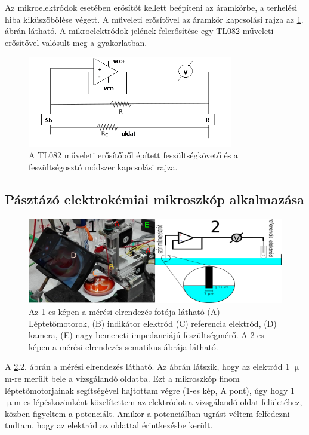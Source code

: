 Az mikroelektródok esetében erősítőt kellett beépíteni az áramkörbe, a terhelési hiba kiküszöbölése végett. A műveleti erősítővel az áramkör kapcsolási rajza az \ref{fig:erosito}. ábrán látható. A mikroelektródok jelének felerősítése egy TL082-műveleti erősítővel valósult meg a gyakorlatban.
\begin{figure}[h!]
\centering
\includegraphics[width=0.8\textwidth]{img/erosito2.png}
\caption{A TL082 műveleti erősítőből épített feszültségkövető és a feszültségosztó módszer kapcsolási rajza.}
\label{fig:erosito}
\end{figure}

\subsection{Pásztázó elektrokémiai mikroszkóp alkalmazása}

\begin{figure}[h]
\centering
\includegraphics[width=1\textwidth]{img/secm.png}
\caption{Az 1-es képen a mérési elrendezés fotója látható (A) Léptetőmotorok, (B) indikátor elektród (C) referencia elektród, (D) kamera, (E) nagy bemeneti impedanciájú feszültségmérő. A 2-es képen a mérési elrendezés sematikus ábrája látható.}
\label{fig:secm}
\end{figure}

A \ref{fig:secm}.2. ábrán a mérési elrendezés látható. Az ábrán látszik, hogy az elektród 1 $\upmu$m-re merült bele a vizsgálandó oldatba. Ezt a mikroszkóp finom léptetőmotorjainak segítségével hajtottam végre (1-es kép, A pont), úgy hogy 1 $\upmu$m-es lépésközönként közelítettem az elektródot a vizsgálandó oldat felületéhez, közben figyeltem a potenciált. Amikor a potenciálban ugrást véltem felfedezni tudtam, hogy az elektród az oldattal érintkezésbe került.

